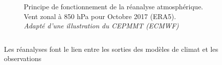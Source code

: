 \documentclass[aspectratio=169, usepdftitle=false, xcolor={dvipsnames}, 9pt,table]{beamer}
\begin{document}
\begin{frame}
\begin{columns}[c]
\begin{column}{0.5\textwidth}
\begin{figure}
                \caption{\scriptsize Principe de fonctionnement de la réanalyse atmosphérique.\\Vent zonal à 850 hPa pour Octobre 2017 (ERA5).\\\textit{Adapté d'une illustration du CEPMMT (ECMWF)}}
            \end{figure} 
        \end{column}
    \end{columns} 
    \begin{center}
        \begin{minipage}{12cm}
            \begin{definition}
                \centering
                \small
                Les réanalyses font le lien entre les sorties des modèles de climat et les observations
            \end{definition}
        \end{minipage}
    \end{center}
\end{frame}
\end{document}

